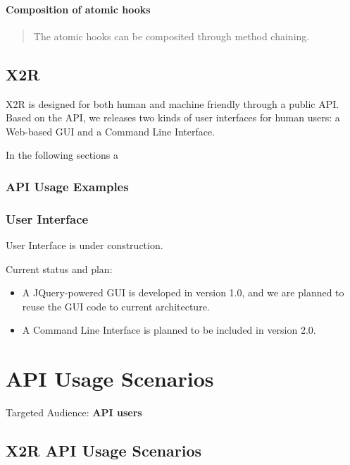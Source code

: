 \documentclass[letterpaper,10pt,english]{sphinxmanual}
\begin{document}
\subsubsection{Composition of atomic hooks}
\label{docs/uss:composition-of-atomic-hooks}\begin{quote}

The atomic hooks can be composited through method chaining.
\end{quote}


\section{X2R}
\label{docs/x2r:id1}\label{docs/x2r::doc}\label{docs/x2r:x2r}
X2R is designed for both human and machine friendly through a public API.
Based on the API, we releases two kinds of user interfaces for human users:
a Web-based GUI and a Command Line Interface.

In the following sections a


\subsection{API Usage Examples}
\label{docs/x2r:api-usage-examples}

\subsection{User Interface}
\label{docs/x2r:user-interface}
User Interface is under construction.

Current status and plan:
\begin{itemize}
\item {} 
A JQuery-powered GUI is developed in version 1.0, and we are planned to reuse the GUI code to current architecture.

\item {} 
A Command Line Interface is planned to be included in version 2.0.

\end{itemize}


\chapter{API Usage Scenarios}
\label{index:api-usage-scenarios}
Targeted Audience: \textbf{API users}


\section{X2R API Usage Scenarios}
\label{docs/scenarios/x2r:x2r-api-usage-scenarios}\label{docs/scenarios/x2r::doc}
\end{document}
